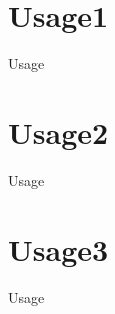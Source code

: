 \documentclass{beamer}
\begin{document}
\section{Usage1}
    \begin{frame}
        Usage
    \end{frame}
\section{Usage2}
    \begin{frame}
        Usage
    \end{frame}
\section{Usage3}
    \begin{frame}
        Usage
    \end{frame}
\end{document}
